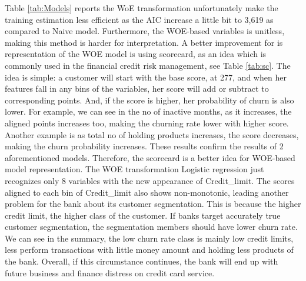 Table \ref{tab:Models} reports the WoE transformation unfortunately make
the training estimation less efficient as the AIC increase a little bit
to 3,619 as compared to Naive model. Furthermore, the WOE-based
variables is unitless, making this method is harder for interpretation.
A better improvement for is representation of the WOE model is using
scorecard, as an idea which is commonly used in the financial credit
risk management, see Table \ref{tab:sc}. The idea is simple: a customer
will start with the base score, at 277, and when her features fall in
any bins of the variables, her score will add or subtract to
corresponding points. And, if the score is higher, her probability of
churn is also lower. For example, we can see in the no of inactive
months, as it increases, the aligned points increases too, making the
churning rate lower with higher score. Another example is as total no of
holding products increases, the score decreases, making the churn
probability increases. These results confirm the results of 2
aforementioned models. Therefore, the scorecard is a better idea for
WOE-based model representation. The WOE transformation Logistic
regression just recognizes only 8 variables with the new appearance of
Credit\_limit. The scores aligned to each bin of Credit\_limit also
shows non-monotonic, leading another problem for the bank about its
customer segmentation. This is because the higher credit limit, the
higher class of the customer. If banks target accurately true customer
segmentation, the segmentation members should have lower churn rate. We
can see in the summary, the low churn rate class is mainly low credit
limits, less perform transactions with little money amount and holding
less products of the bank. Overall, if this circumstance continues, the
bank will end up with future business and finance distress on credit
card service.

